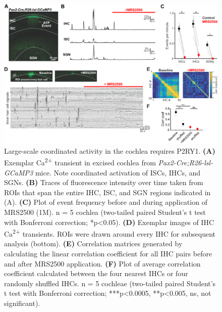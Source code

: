 \documentclass[9pt,lineno]{elife}
\begin{document}
\begin{figure}
\begin{fullwidth}
\includegraphics[width=.95\linewidth]{figures/Fig5.pdf}
\caption{Large-scale coordinated activity in the cochlea requires P2RY1.
\textbf{(A)} Exemplar Ca\textsuperscript{2+} transient in excised cochlea from \textit{Pax2-Cre;R26-lsl-GCaMP3} mice. Note coordinated activation of ISCs, IHCs, and SGNs. 
\textbf{(B)} Traces of fluorescence intensity over time taken from ROIs that span the entire IHC, ISC, and SGN regions indicated in (A).
\textbf{(C)} Plot of event frequency before and during application of MRS2500 (1\textmu M). n = 5 cochlea (two-tailed paired Student's t test with Bonferroni correction; *p<0.05).
\textbf{(D)} Exemplar images of IHC Ca\textsuperscript{2+} transients. ROIs were drawn around every IHC for subsequent analysis (bottom). 
\textbf{(E)} Correlation matrices generated by calculating the linear correlation coefficient for all IHC pairs before and after MRS2500 application.
\textbf{(F)} Plot of average correlation coefficient calculated between the four nearest IHCs or four randomly shuffled IHCs. n = 5 cochleae (two-tailed paired Student's t test with Bonferroni correction; ***p<0.0005, **p<0.005, ns, not significant).
}
\label{fig:f5}
\end{fullwidth}
\end{figure}
\end{document}
